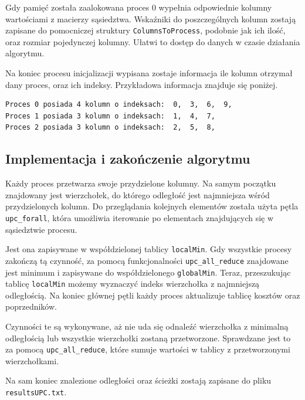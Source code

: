 \documentclass[12pt]{article}
\begin{document}
Gdy pamięć została zaalokowana proces 0 wypełnia odpowiednie kolumny wartościami z macierzy sąsiedztwa. Wskaźniki do poszczególnych kolumn zostają zapisane do pomocniczej struktury \lstinline{ColumnsToProcess}, podobnie jak ich ilość, oraz rozmiar pojedynczej kolumny. Ułatwi to dostęp do danych w czasie działania algorytmu.

Na koniec procesu inicjalizacji wypisana zostaje informacja ile kolumn otrzymał dany proces, oraz ich indeksy. Przykładowa informacja znajduje się poniżej.

\begin{lstlisting}
Proces 0 posiada 4 kolumn o indeksach:  0,  3,  6,  9,
Proces 1 posiada 3 kolumn o indeksach:  1,  4,  7,
Proces 2 posiada 3 kolumn o indeksach:  2,  5,  8,
\end{lstlisting}

\subsection{Implementacja i zakończenie algorytmu}
Każdy proces przetwarza swoje przydzielone kolumny. Na samym początku znajdowany jest wierzchołek, do którego odległość jest najmniejsza wśród przydzielonych kolumn. Do przeglądania kolejnych elementów została użyta pętla \lstinline{upc_forall}, która umożliwia iterowanie po elementach znajdujących się w sąsiedztwie procesu.

 Jest ona zapisywane w współdzielonej tablicy \lstinline{localMin}. Gdy wszystkie procesy zakończą tą czynność, za pomocą funkcjonalności \lstinline{upc_all_reduce} znajdowane jest minimum i zapisywane do współdzielonego \lstinline{globalMin}. Teraz, przeszukując tablicę \lstinline{localMin} możemy wyznaczyć indeks wierzchołka z najmniejszą odległością. Na koniec głównej pętli każdy proces aktualizuje tablicę kosztów oraz poprzedników.

Czynności te są wykonywane, aż nie uda się odnaleźć wierzchołka z minimalną odległością lub wszystkie wierzchołki zostaną przetworzone. Sprawdzane jest to za pomocą \lstinline{upc_all_reduce}, które sumuje wartości w tablicy z przetworzonymi wierzchołkami.

Na sam koniec znalezione odległości oraz ścieżki zostają zapisane do pliku \lstinline{resultsUPC.txt}.
\end{document}
